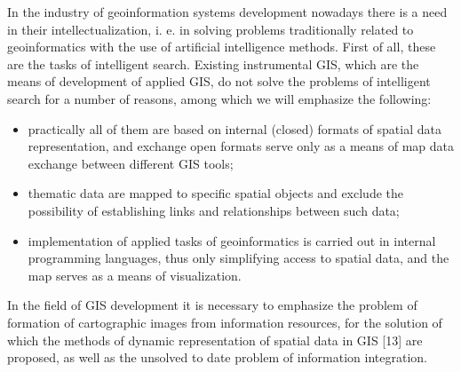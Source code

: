 \documentclass[a4paper]{article}
\begin{document}
\begin{multicols}{2}
{ In the industry of geoinformation systems development
nowadays there is a need in their intellectualization, i. e.
in solving problems traditionally related to geoinformatics with the use of artificial intelligence methods. First
of all, these are the tasks of intelligent search. Existing
instrumental GIS, which are the means of development
of applied GIS, do not solve the problems of intelligent
search for a number of reasons, among which we will
emphasize the following:
\par

\begin{itemize}[leftmargin=5mm]
        
        \item practically all of them are based on internal (closed)
formats of spatial data representation, and exchange
open formats serve only as a means of map data
exchange between different GIS tools;
        \item thematic data are mapped to specific spatial objects and exclude the possibility of establishing links and
relationships between such data;
\item  implementation of applied tasks of geoinformatics
is carried out in internal programming languages,
thus only simplifying access to spatial data, and the
map serves as a means of visualization.
\end{itemize}

 
 In the field of GIS development it is necessary to
emphasize the problem of formation of cartographic
images from information resources, for the solution of
which the methods of dynamic representation of spatial
data in GIS [13] are proposed, as well as the unsolved
to date problem of information integration.
\par

}
\end{multicols}
\end{document}
